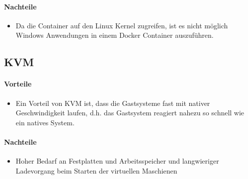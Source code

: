 \paragraph{Nachteile}
\begin{itemize}
	\item Da die Container auf den Linux Kernel zugreifen, ist es nicht möglich Windows Anwendungen in einem Docker Container auszuführen.
\end{itemize}

\subsection{KVM} %
\paragraph{Vorteile}
\begin{itemize}
	\item Ein Vorteil von KVM ist, dass die Gastsysteme fast mit nativer Geschwindigkeit laufen, d.h. das Gastsystem reagiert nahezu so schnell wie ein natives System. 
\end{itemize}
\paragraph{Nachteile}
\begin{itemize}
	\item Hoher Bedarf an Festplatten und Arbeitsspeicher und langwieriger Ladevorgang beim Starten der virtuellen Maschienen
\end{itemize}


